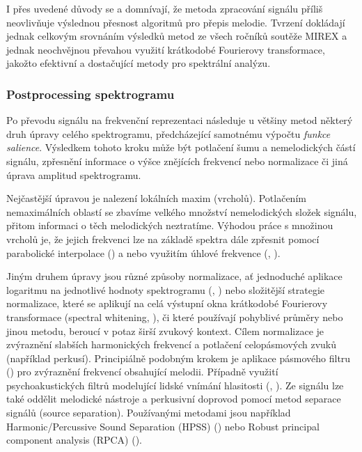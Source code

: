 I přes uvedené důvody se \cite{Salamon2014} a \cite{Dressler2016} domnívají, že metoda zpracování signálu příliš neovlivňuje výslednou přesnost algoritmů pro přepis melodie. Tvrzení dokládají jednak celkovým srovnáním výsledků metod ze všech ročníků soutěže MIREX a jednak neochvějnou převahou využití krátkodobé Fourierovy transformace, jakožto efektivní a dostačující metody pro spektrální analýzu.

\subsubsection{Postprocessing spektrogramu}

Po převodu signálu na frekvenční reprezentaci následuje u většiny metod některý druh úpravy celého spektrogramu, předcházející samotnému výpočtu \emph{funkce salience}. Výsledkem tohoto kroku může být potlačení šumu a nemelodických částí signálu, zpřesnění informace o výšce znějících frekvencí nebo normalizace či jiná úprava amplitud spektrogramu.

Nejčastější úpravou je nalezení lokálních maxim (vrcholů). Potlačením nemaximálních oblastí se zbavíme velkého množství nemelodických složek signálu, přitom informaci o těch melodických neztratíme. Výhodou práce s množinou vrcholů je, že jejich frekvenci lze na základě spektra dále zpřesnit pomocí parabolické interpolace (\cite{Rao2010}) a nebo využitím úhlové frekvence (\cite{Salamon2012a}, \cite{Dressler2009}). 

Jiným druhem úpravy jsou různé způsoby normalizace, ať jednoduché aplikace logaritmu na jednotlivé hodnoty spektrogramu (\cite{Cancela2008}, \cite{Bittner2017}) nebo složitější strategie normalizace, které se aplikují na celá výstupní okna krátkodobé Fourierovy transformace (spectral whitening, \cite{Ryynanen2008}), či které používají pohyblivé průměry nebo jinou metodu, beroucí v potaz širší zvukový kontext. Cílem normalizace je zvýraznění slabších harmonických frekvencí a potlačení celopásmových zvuků (například perkusí). Principiálně podobným krokem je aplikace pásmového filtru (\cite{Goto1999}) pro zvýraznění frekvencí obsahující melodii. Případně využití psychoakustických filtrů modelující lidské vnímání hlasitosti (\cite{Salamon2012a}, \cite{Ikemiya2016}). Ze signálu lze také oddělit melodické nástroje a perkusivní doprovod pomocí metod separace signálů (source separation). Používanými metodami jsou například Harmonic/Percussive Sound Separation (HPSS) (\cite{Tachibana2010}) nebo Robust principal component analysis (RPCA) (\cite{Ikemiya2016}).

